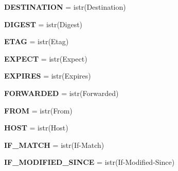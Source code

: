 \begin{DoxyCompactItemize}
{\bfseries D\+E\+S\+T\+I\+N\+A\+T\+I\+ON} = istr(\textquotesingle{}Destination\textquotesingle{})
\item 
\mbox{\label{namespaceaiohttp_1_1hdrs_a17b515644ba6366b42458a351192f3ba}} 
{\bfseries D\+I\+G\+E\+ST} = istr(\textquotesingle{}Digest\textquotesingle{})
\item 
\mbox{\label{namespaceaiohttp_1_1hdrs_a9acee4854531ac40cf381b2a9fb93776}} 
{\bfseries E\+T\+AG} = istr(\textquotesingle{}Etag\textquotesingle{})
\item 
\mbox{\label{namespaceaiohttp_1_1hdrs_a43e3113eb94c9c24ef34d07080671297}} 
{\bfseries E\+X\+P\+E\+CT} = istr(\textquotesingle{}Expect\textquotesingle{})
\item 
\mbox{\label{namespaceaiohttp_1_1hdrs_a8c6defb8769372c198a9ea5847ae892f}} 
{\bfseries E\+X\+P\+I\+R\+ES} = istr(\textquotesingle{}Expires\textquotesingle{})
\item 
\mbox{\label{namespaceaiohttp_1_1hdrs_a53e1e554af6980a7706133261a0036b1}} 
{\bfseries F\+O\+R\+W\+A\+R\+D\+ED} = istr(\textquotesingle{}Forwarded\textquotesingle{})
\item 
\mbox{\label{namespaceaiohttp_1_1hdrs_a69c431b1f6f44b2dd20692f618666de8}} 
{\bfseries F\+R\+OM} = istr(\textquotesingle{}From\textquotesingle{})
\item 
\mbox{\label{namespaceaiohttp_1_1hdrs_a695aa32cf750a4f05f252d62fc626106}} 
{\bfseries H\+O\+ST} = istr(\textquotesingle{}Host\textquotesingle{})
\item 
\mbox{\label{namespaceaiohttp_1_1hdrs_a34aed4374bc9c0ad67e6426f50eb0070}} 
{\bfseries I\+F\+\_\+\+M\+A\+T\+CH} = istr(\textquotesingle{}If-\/Match\textquotesingle{})
\item 
\mbox{\label{namespaceaiohttp_1_1hdrs_a3b6e1530c4cb9c951d5f311e8a99a2e8}} 
{\bfseries I\+F\+\_\+\+M\+O\+D\+I\+F\+I\+E\+D\+\_\+\+S\+I\+N\+CE} = istr(\textquotesingle{}If-\/Modified-\/Since\textquotesingle{})

\end{DoxyCompactItemize}
